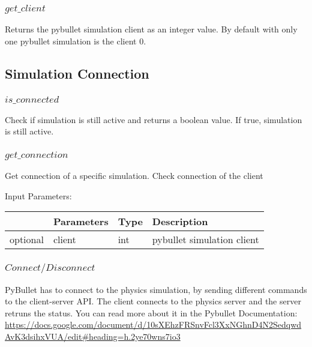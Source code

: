 \documentclass[
	ngerman,
	accentcolor=9c,%
	type=intern,
	marginpar=false
	]{tudapub}
\begin{document}
\subsubsection{$get\_client$}
\noindent Returns the pybullet simulation client as an integer value. By default with only one pybullet simulation is the client 0.


\subsection{Simulation Connection}
\subsubsection{$is\_connected$}
\noindent Check if simulation is still active and returns a boolean value. If true, simulation is still active.

\vspace{0.5cm} 



\subsubsection{$get\_connection$}
\noindent Get connection of a specific simulation. Check connection of the client


\vspace{0.5cm}
\noindent Input Parameters:
\vspace{0.5cm}

\begin{tabular}{|p{}|p{}|p{}| p{}|}
\hline
 & \textbf{Parameters} & \textbf{Type} & \textbf{Description} \\
\hline
optional & client & int & pybullet simulation client\\
\hline
\end{tabular}
\vspace{0.5cm}




\subsubsection{$Connect/Disconnect$}
\label{sec:connect}
PyBullet has to connect to the physics simulation, by sending different commands to the client-server API. The client connects to the physics server and the server retruns the status.  You can read more about it in the Pybullet Documentation: \url{https://docs.google.com/document/d/10sXEhzFRSnvFcl3XxNGhnD4N2SedqwdAvK3dsihxVUA/edit#heading=h.2ye70wns7io3}
\end{document}
